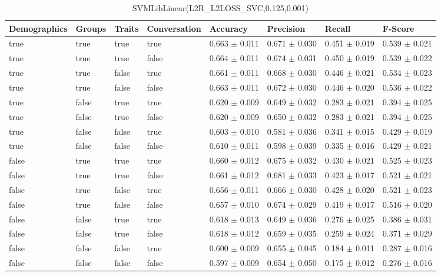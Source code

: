\begin{table}[h]
	\centering
	\begin{tabular}{|l|l|l|l|l|l|l|l|} %
	\hline
	Demographics & Groups & Traits & Conversation & Accuracy & Precision & Recall & F-Score \\ \hline
	true & true & true & true & 0.663	\( \pm \) 0.011	& 0.671	\( \pm \) 0.030	& 0.451	\( \pm \) 0.019	& 0.539	\( \pm \) 0.021	\\ \hline
	true & true & true & false & 0.664	\( \pm \) 0.011	& 0.674	\( \pm \) 0.031	& 0.450	\( \pm \) 0.019	& 0.539	\( \pm \) 0.022	\\ \hline
	true & true & false & true & 0.661	\( \pm \) 0.011	& 0.668	\( \pm \) 0.030	& 0.446	\( \pm \) 0.021	& 0.534	\( \pm \) 0.023	\\ \hline
	true & true & false & false & 0.663	\( \pm \) 0.011	& 0.672	\( \pm \) 0.030	& 0.446	\( \pm \) 0.020	& 0.536	\( \pm \) 0.022	\\ \hline
	true & false & true & true & 0.620	\( \pm \) 0.009	& 0.649	\( \pm \) 0.032	& 0.283	\( \pm \) 0.021	& 0.394	\( \pm \) 0.025	\\ \hline
	true & false & true & false & 0.620	\( \pm \) 0.009	& 0.650	\( \pm \) 0.032	& 0.283	\( \pm \) 0.021	& 0.394	\( \pm \) 0.025	\\ \hline
	true & false & false & true & 0.603	\( \pm \) 0.010	& 0.581	\( \pm \) 0.036	& 0.341	\( \pm \) 0.015	& 0.429	\( \pm \) 0.019	\\ \hline
	true & false & false & false & 0.610	\( \pm \) 0.011	& 0.598	\( \pm \) 0.039	& 0.335	\( \pm \) 0.016	& 0.429	\( \pm \) 0.021	\\ \hline
	false & true & true & true & 0.660	\( \pm \) 0.012	& 0.675	\( \pm \) 0.032	& 0.430	\( \pm \) 0.021	& 0.525	\( \pm \) 0.023	\\ \hline
	false & true & true & false & 0.661	\( \pm \) 0.012	& 0.681	\( \pm \) 0.033	& 0.423	\( \pm \) 0.017	& 0.521	\( \pm \) 0.021	\\ \hline
	false & true & false & true & 0.656	\( \pm \) 0.011	& 0.666	\( \pm \) 0.030	& 0.428	\( \pm \) 0.020	& 0.521	\( \pm \) 0.023	\\ \hline
	false & true & false & false & 0.657	\( \pm \) 0.010	& 0.674	\( \pm \) 0.029	& 0.419	\( \pm \) 0.017	& 0.516	\( \pm \) 0.020	\\ \hline
	false & false & true & true & 0.618	\( \pm \) 0.013	& 0.649	\( \pm \) 0.036	& 0.276	\( \pm \) 0.025	& 0.386	\( \pm \) 0.031	\\ \hline
	false & false & true & false & 0.618	\( \pm \) 0.012	& 0.659	\( \pm \) 0.035	& 0.259	\( \pm \) 0.024	& 0.371	\( \pm \) 0.029	\\ \hline
	false & false & false & true & 0.600	\( \pm \) 0.009	& 0.655	\( \pm \) 0.045	& 0.184	\( \pm \) 0.011	& 0.287	\( \pm \) 0.016	\\ \hline
	false & false & false & false & 0.597	\( \pm \) 0.009	& 0.654	\( \pm \) 0.050	& 0.175	\( \pm \) 0.012	& 0.276	\( \pm \) 0.016	\\ \hline
	\end{tabular}
	\caption{SVMLibLinear(L2R\_L2LOSS\_SVC,0.125,0.001)}
	\label{tab:revpol}
\end{table}
